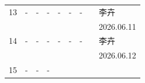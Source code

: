 \documentclass[UTF8,10pt,a4paper,fontset=fandol]{ctexart}
\newcommand{\fieldvalue}[1]{#1}
\newcommand{\handwritten}[1]{#1}
\begin{document}
\begin{center}
\begin{tabular}{|c|c|c|c|c|c|c|p{2.2cm}|p{2.8cm}|}
\fieldvalue{\handwritten{13}} &
\fieldvalue{\handwritten{-}} &
\fieldvalue{\handwritten{-}} &
\fieldvalue{\handwritten{-}} &
\fieldvalue{\handwritten{-}} &
\fieldvalue{\handwritten{-}} &
\fieldvalue{\handwritten{-}} &
&
\fieldvalue{\handwritten{李卉}}\\[-1mm]
&
&
&
&
&
&
&
&
\fieldvalue{\handwritten{2026.06.11}}\\
\hline
\fieldvalue{\handwritten{14}} &
\fieldvalue{\handwritten{-}} &
\fieldvalue{\handwritten{-}} &
\fieldvalue{\handwritten{-}} &
\fieldvalue{\handwritten{-}} &
\fieldvalue{\handwritten{-}} &
\fieldvalue{\handwritten{-}} &
&
\fieldvalue{\handwritten{李卉}}\\[-1mm]
&
&
&
&
&
&
&
&
\fieldvalue{\handwritten{2026.06.12}}\\
\hline
\fieldvalue{\handwritten{15}} &
\fieldvalue{\handwritten{-}} &
\fieldvalue{\handwritten{-}} &
\fieldvalue{\handwritten{-}} &

\end{tabular}
\end{center}
\end{document}
